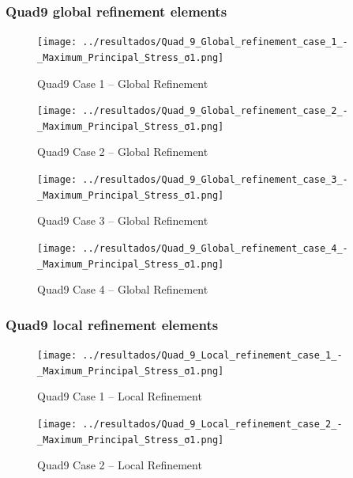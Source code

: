 \documentclass[12pt]{article}
\begin{document}
\newpage
\subsubsection{Quad9 global refinement elements}

\begin{figure}[H]
    \centering
    \begin{minipage}{0.48\textwidth}
        \centering
        \texttt{[image: ../resultados/Quad\_9\_Global\_refinement\_case\_1\_-\_Maximum\_Principal\_Stress\_σ1.png]}
        \caption{Quad9 Case 1 – Global Refinement}
        \label{fig:quad9_results_global1}
    \end{minipage}
    \hfill
    \begin{minipage}{0.48\textwidth}
        \centering
        \texttt{[image: ../resultados/Quad\_9\_Global\_refinement\_case\_2\_-\_Maximum\_Principal\_Stress\_σ1.png]}
        \caption{Quad9 Case 2 – Global Refinement}
        \label{fig:quad9_results_global2}
    \end{minipage}
\end{figure}

\begin{figure}[H]
    \centering
    \begin{minipage}{0.48\textwidth}
        \centering
        \texttt{[image: ../resultados/Quad\_9\_Global\_refinement\_case\_3\_-\_Maximum\_Principal\_Stress\_σ1.png]}
        \caption{Quad9 Case 3 – Global Refinement}
        \label{fig:quad9_results_global3}
    \end{minipage}
    \hfill
    \begin{minipage}{0.48\textwidth}
        \centering
        \texttt{[image: ../resultados/Quad\_9\_Global\_refinement\_case\_4\_-\_Maximum\_Principal\_Stress\_σ1.png]}
        \caption{Quad9 Case 4 – Global Refinement}
        \label{fig:quad9_results_global4}
    \end{minipage}
\end{figure}

\newpage
\subsubsection{Quad9 local refinement elements}

\begin{figure}[H]
    \centering
    \begin{minipage}{0.48\textwidth}
        \centering
        \texttt{[image: ../resultados/Quad\_9\_Local\_refinement\_case\_1\_-\_Maximum\_Principal\_Stress\_σ1.png]}
        \caption{Quad9 Case 1 – Local Refinement}
        \label{fig:quad9_results_local1}
    \end{minipage}
    \hfill
    \begin{minipage}{0.48\textwidth}
        \centering
        \texttt{[image: ../resultados/Quad\_9\_Local\_refinement\_case\_2\_-\_Maximum\_Principal\_Stress\_σ1.png]}
        \caption{Quad9 Case 2 – Local Refinement}
        \label{fig:quad9_results_local2}
    \end{minipage}
\end{figure}
\end{document}
